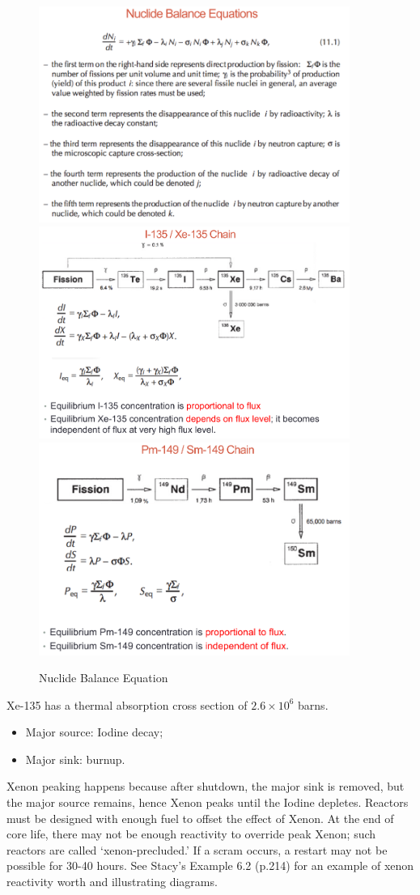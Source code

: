 \documentclass{school-22.211-notes}
\begin{document}
\clearpage
\begin{figure}[ht]
  \centering
  \includegraphics[width=4in]{images/dfs/nuclide-balance-equation.png}
  \includegraphics[width=4in]{images/dfs/I-Xe.png}
  \includegraphics[width=4in]{images/dfs/Pm-Sm.png}
  \caption{Nuclide Balance Equation} \label{nbe} 
\end{figure}



\clearpage
{}
Xe-135 has a thermal absorption cross section of $2.6\times 10^6$ barns. 
\begin{itemize}
\item Major source: Iodine decay; 
\item Major sink: burnup. 
\end{itemize}
Xenon peaking happens because after shutdown, the major sink is removed, but the major source remains, hence Xenon peaks until the Iodine depletes. Reactors must be designed with enough fuel to offset the effect of Xenon. At the end of core life, there may not be enough reactivity to override peak Xenon; such reactors are called `xenon-precluded.' If a scram occurs, a restart may not be possible for 30-40 hours. See Stacy's Example 6.2 (p.214) for an example of xenon reactivity worth and illustrating diagrams. 
\end{document}
